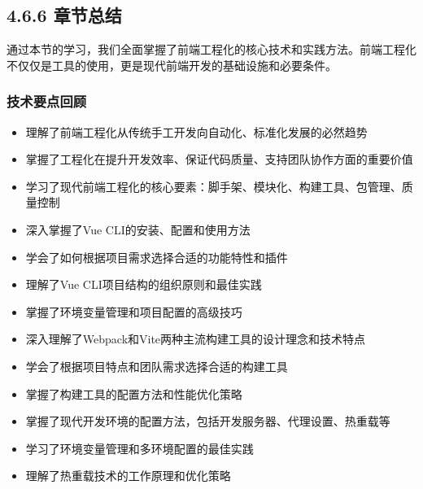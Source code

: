 \hypertarget{ux7ae0ux8282ux603bux7ed3}{%
\subsection{4.6.6 章节总结}\label{ux7ae0ux8282ux603bux7ed3}}

通过本节的学习，我们全面掌握了前端工程化的核心技术和实践方法。前端工程化不仅仅是工具的使用，更是现代前端开发的基础设施和必要条件。

\hypertarget{ux6280ux672fux8981ux70b9ux56deux987e}{%
\subsubsection{技术要点回顾}\label{ux6280ux672fux8981ux70b9ux56deux987e}}


\begin{itemize}
\tightlist
\item
  理解了前端工程化从传统手工开发向自动化、标准化发展的必然趋势
\item
  掌握了工程化在提升开发效率、保证代码质量、支持团队协作方面的重要价值
\item
  学习了现代前端工程化的核心要素：脚手架、模块化、构建工具、包管理、质量控制
\end{itemize}


\begin{itemize}
\tightlist
\item
  深入掌握了Vue CLI的安装、配置和使用方法
\item
  学会了如何根据项目需求选择合适的功能特性和插件
\item
  理解了Vue CLI项目结构的组织原则和最佳实践
\item
  掌握了环境变量管理和项目配置的高级技巧
\end{itemize}


\begin{itemize}
\tightlist
\item
  深入理解了Webpack和Vite两种主流构建工具的设计理念和技术特点
\item
  学会了根据项目特点和团队需求选择合适的构建工具
\item
  掌握了构建工具的配置方法和性能优化策略
\end{itemize}


\begin{itemize}
\tightlist
\item
  掌握了现代开发环境的配置方法，包括开发服务器、代理设置、热重载等
\item
  学习了环境变量管理和多环境配置的最佳实践
\item
  理解了热重载技术的工作原理和优化策略
\end{itemize}

